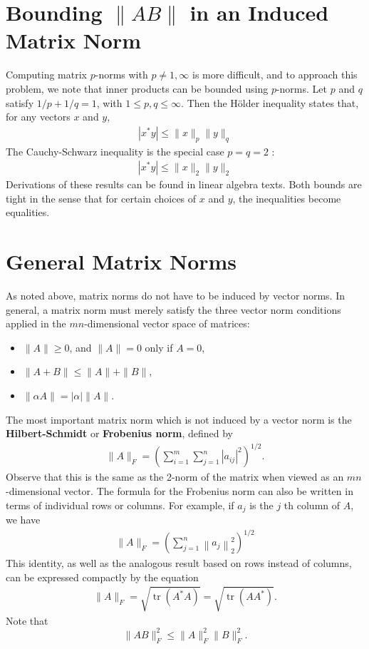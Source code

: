 \section{Bounding $\|AB\|$ in an Induced Matrix Norm} 
Computing matrix $p$-norms with $p \neq 1, \infty$ is more difficult, and to approach this problem, we note that inner products can be bounded using $p$-norms. Let $p$ and $q$ satisfy $1 / p+1 / q=1$, with $1 \leq p, q \leq \infty$. Then the Hölder inequality states that, for any vectors $x$ and $y$,
\begin{align*}
\left|x^* y\right| \leq\|x\|_p\|y\|_q
\end{align*}
The Cauchy-Schwarz inequality is the special case $p=q=2$ :
\begin{align*}
\left|x^* y\right| \leq\|x\|_2\|y\|_2
\end{align*}
Derivations of these results can be found in linear algebra texts. Both bounds are tight in the sense that for certain choices of $x$ and $y$, the inequalities become equalities.

\section{General Matrix Norms}
As noted above, matrix norms do not have to be induced by vector norms. In general, a matrix norm must merely satisfy the three vector norm conditions applied in the $m n$-dimensional vector space of matrices:
\begin{itemize}
    \item $\|A\| \geq 0$, and $\|A\|=0$ only if $A=0$,
    \item $\|A+B\| \leq\|A\|+\|B\|$,
    \item $\|\alpha A\|=|\alpha|\|A\|$.
\end{itemize}
The most important matrix norm which is not induced by a vector norm is the \textbf{Hilbert-Schmidt} or \textbf{Frobenius norm}, defined by
\begin{align*}
\|A\|_F=\left(\sum_{i=1}^m \sum_{j=1}^n\left|a_{i j}\right|^2\right)^{1 / 2} .
\end{align*}
Observe that this is the same as the 2-norm of the matrix when viewed as an $m n$-dimensional vector. The formula for the Frobenius norm can also be written in terms of individual rows or columns. For example, if $a_j$ is the $j$ th column of $A$, we have
\begin{align*}
\|A\|_F=\left(\sum_{j=1}^n\left\|a_j\right\|_2^2\right)^{1 / 2}
\end{align*}
This identity, as well as the analogous result based on rows instead of columns, can be expressed compactly by the equation
\begin{align*}
\|A\|_F=\sqrt{\operatorname{tr}\left(A^* A\right)}=\sqrt{\operatorname{tr}\left(A A^*\right)}. 
\end{align*}
Note that 
\[
    \|AB\|_F^2 \le \|A\|_F^2 \|B\|_F^2. 
\]

